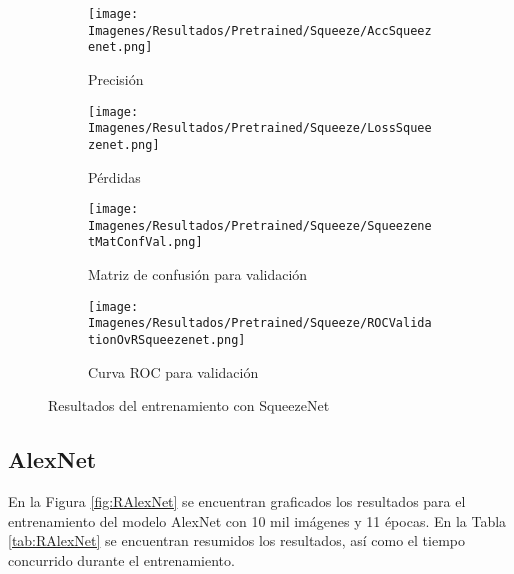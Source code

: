 \documentclass{report}
\begin{document}
\vspace{0.4cm}
\begin{figure}[H]
	 	\centering
	 	\begin{subfigure}[b]{0.45\linewidth}
	 	\centering
	 		\texttt{[image: Imagenes/Resultados/Pretrained/Squeeze/AccSqueezenet.png]}
	 		\caption{ Precisión  }
                    \label{fig:SqueezePrecision}
	 	\end{subfigure}
	 	\begin{subfigure}[b]{0.45\linewidth}
	 	\centering
	 		\texttt{[image: Imagenes/Resultados/Pretrained/Squeeze/LossSqueezenet.png]}
                    \caption{ Pérdidas }
                    \label{fig:SqueeenetLoss}
	 	\end{subfigure}
	 	\centering
	 	\begin{subfigure}[b]{0.45\linewidth}
	 	\centering
	 		\texttt{[image: Imagenes/Resultados/Pretrained/Squeeze/SqueezenetMatConfVal.png]}
	 		\caption{ Matriz de confusión para validación }
                    \label{fig:SqueeenetMatConf}
	 	\end{subfigure}
	 	\centering
	 	\begin{subfigure}[b]{0.45\linewidth}
	 	\centering
	 		\texttt{[image: Imagenes/Resultados/Pretrained/Squeeze/ROCValidationOvRSqueezenet.png]}
	 		\caption{ Curva ROC para validación }
                    \label{fig:SqueeenetCurvaROC}
	 	\end{subfigure}
	 	\caption{ Resultados del entrenamiento con SqueezeNet}
	 	\label{fig:RSqueeze}
\end{figure}
\vspace{4cm}





\newpage
\vspace{4cm}
\newpage
\subsection{AlexNet}

En la Figura \ref{fig:RAlexNet} se encuentran graficados los resultados para el entrenamiento del modelo AlexNet con 10 mil imágenes y 11 épocas. En la Tabla \ref{tab:RAlexNet} se encuentran resumidos los resultados, así como el tiempo concurrido durante el entrenamiento.
\end{document}

